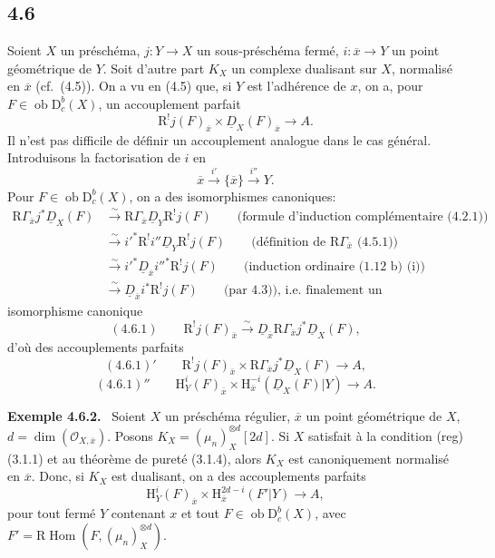 \documentclass[11pt]{article}
\providecommand{\cO}{\mathcal{O}}
\newenvironment{statement}[1]{\par\medskip\noindent\textbf{#1.}\ }{\par\medskip}
\renewcommand{\H}{\mathrm{H}}
\DeclareMathOperator{\Hom}{Hom}
\newcommand{\R}{\mathrm{R}}
\newcommand{\D}{\mathrm{D}}
\newcommand{\ob}{\operatorname{ob}}
\newcommand{\ol}[1]{\overline{#1}}
\providecommand{\Hom}{\operatorname{Hom}}
\providecommand{\ob}{\operatorname{ob}}
\providecommand{\R}{\mathrm R}
\providecommand{\Hom}{\operatorname{Hom}}
\begin{document}
\subsection*{4.6}
Soient $X$ un préschéma, $j:Y\to X$ un sous-préschéma fermé, $i:\ol{x}\to Y$ un point géométrique de $Y$. Soit d'autre part $K_X$ un complexe dualisant sur $X$, normalisé en $\ol{x}$ (cf.~(4.5)). On a vu en (4.5) que, si $Y$ est l'adhérence de $x$, on a, pour $F\in\ob\D_c^b(X)$, un accouplement parfait
\[
\R^{!}j(F)_{\ol{x}}\times \underline{D}_X(F)_{\ol{x}}\longrightarrow A.
\]
Il n'est pas difficile de définir un accouplement analogue dans le cas général. Introduisons la factorisation de $i$ en
\[
\ol{x}\xrightarrow{i'}\{\ol{x}\}\xrightarrow{i''}Y.
\]
Pour $F\in\ob\D_c^b(X)$, on a des isomorphismes canoniques:
\[
\begin{aligned}
\R\Gamma_{\ol{x}}j^*\underline{D}_X(F)&\xrightarrow{\sim}\R\Gamma_{\ol{x}}\underline{D}_Y\R^{!}j(F)\qquad\text{(formule d'induction complémentaire (4.2.1))}\\
&\xrightarrow{\sim}i'^*\R^{!}i''\underline{D}_Y\R^{!}j(F)\qquad\text{(définition de $\R\Gamma_{\ol{x}}$ (4.5.1))}\\
&\xrightarrow{\sim}i'^*\underline{D}_{\ol{x}}i''^*\R^{!}j(F)\qquad\text{(induction ordinaire (1.12 b) (i))}\\
&\xrightarrow{\sim}\underline{D}_{\ol{x}}i^*\R^{!}j(F)\qquad\text{(par 4.3)), i.e. finalement un}
\end{aligned}
\]
isomorphisme canonique
\[
(4.6.1)\qquad \R^{!}j(F)_{\ol{x}}\xrightarrow{\sim}\underline{D}_{\ol{x}}\R\Gamma_{\ol{x}}j^*\underline{D}_X(F),
\]
d'où des accouplements parfaits
\[
(4.6.1)'\qquad \R^{!}j(F)_{\ol{x}}\times \R\Gamma_{\ol{x}}j^*\underline{D}_X(F)\longrightarrow A,
\]
\[
(4.6.1)''\qquad \H_Y^i(F)_{\ol{x}}\times \H_{\ol{x}}^{-i}(\underline{D}_X(F)|Y)\longrightarrow A.
\]

\begin{statement}{Exemple 4.6.2}
Soient $X$ un préschéma régulier, $\ol{x}$ un point géométrique de $X$, $d=\dim(\cO_{X,\ol{x}})$. Posons $K_X=(\mu_n)_X^{\otimes d}[2d]$. Si $X$ satisfait à la condition (reg) (3.1.1) et au théorème de pureté (3.1.4), alors $K_X$ est canoniquement normalisé en $\ol{x}$. Donc, si $K_X$ est dualisant, on a des accouplements parfaits
\[
\H_Y^i(F)_{\ol{x}}\times \H_{\ol{x}}^{2d-i}(F'|Y)\longrightarrow A,
\]
pour tout fermé $Y$ contenant $x$ et tout $F\in\ob\D_c^b(X)$, avec $F'=\R\Hom(F,(\mu_n)_X^{\otimes d})$.
\end{statement}
\end{document}
